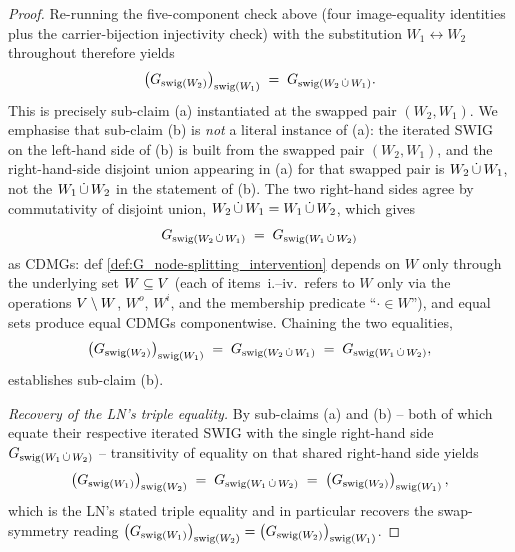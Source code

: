 \documentclass[main]{subfiles}
\begin{document}
\begin{proof}
\medskip
Re-running the five-component check above (four image-equality identities plus the carrier-bijection injectivity check) with the substitution $W_1 \leftrightarrow W_2$ throughout therefore yields
\[ \left ( G_{\mathrm{swig}(W_2)} \right )_{\mathrm{swig}(W_1)} \;=\; G_{\mathrm{swig}(W_2 \,\dot{\cup}\, W_1)}. \]
This is precisely sub-claim (a) instantiated at the swapped pair $(W_2, W_1)$. We emphasise that sub-claim (b) is \emph{not} a literal instance of (a): the iterated SWIG on the left-hand side of (b) is built from the swapped pair $(W_2, W_1)$, and the right-hand-side disjoint union appearing in (a) for that swapped pair is $W_2 \,\dot{\cup}\, W_1$, not the $W_1 \,\dot{\cup}\, W_2$ in the statement of (b). The two right-hand sides agree by commutativity of disjoint union, $W_2 \,\dot{\cup}\, W_1 = W_1 \,\dot{\cup}\, W_2$, which gives
\[ G_{\mathrm{swig}(W_2 \,\dot{\cup}\, W_1)} \;=\; G_{\mathrm{swig}(W_1 \,\dot{\cup}\, W_2)} \]
as CDMGs: def \ref{def:G_node-splitting_intervention} depends on $W$ only through the underlying set $W \subseteq V$ (each of items~i.--iv.\ refers to $W$ only via the operations $V \setminus W$, $W^o$, $W^i$, and the membership predicate ``$\cdot \in W$''), and equal sets produce equal CDMGs componentwise. Chaining the two equalities,
\[ \left ( G_{\mathrm{swig}(W_2)} \right )_{\mathrm{swig}(W_1)} \;=\; G_{\mathrm{swig}(W_2 \,\dot{\cup}\, W_1)} \;=\; G_{\mathrm{swig}(W_1 \,\dot{\cup}\, W_2)}, \]
establishes sub-claim (b).

\medskip\noindent\emph{Recovery of the LN's triple equality.}
By sub-claims (a) and (b) -- both of which equate their respective iterated SWIG with the single right-hand side $G_{\mathrm{swig}(W_1 \,\dot{\cup}\, W_2)}$ -- transitivity of equality on that shared right-hand side yields
\[ \left ( G_{\mathrm{swig}(W_1)} \right )_{\mathrm{swig}(W_2)} \;=\; G_{\mathrm{swig}(W_1 \,\dot{\cup}\, W_2)} \;=\; \left ( G_{\mathrm{swig}(W_2)} \right )_{\mathrm{swig}(W_1)}, \]
which is the LN's stated triple equality and in particular recovers the swap-symmetry reading $\left ( G_{\mathrm{swig}(W_1)} \right )_{\mathrm{swig}(W_2)} = \left ( G_{\mathrm{swig}(W_2)} \right )_{\mathrm{swig}(W_1)}$.


\end{proof}
\end{document}
